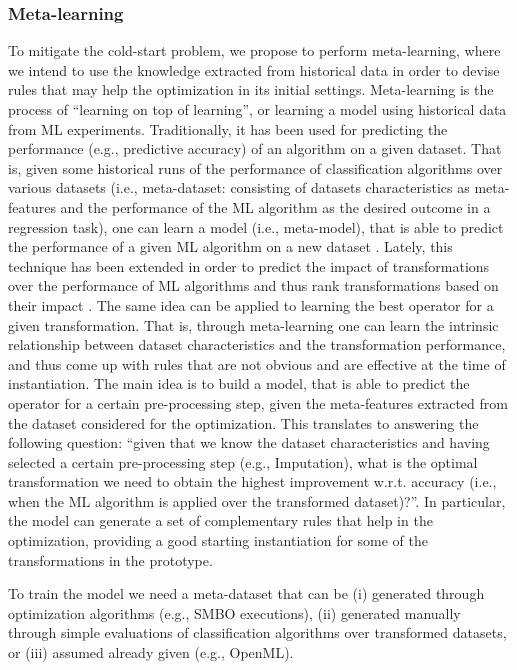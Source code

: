 \subsubsection{Meta-learning}
To mitigate the cold-start problem, we propose to perform meta-learning, where we intend to use the knowledge extracted from historical data in order to devise rules that may help the optimization in its initial settings.
Meta-learning is the process of ``learning on top of learning'', or learning a model using historical data from ML experiments.
Traditionally, it has been used for predicting the performance (e.g., predictive accuracy) of an algorithm on a given dataset.
That is, given some historical runs of the performance of classification algorithms over various datasets (i.e., meta-dataset: consisting of datasets characteristics as meta-features and the performance of the ML algorithm as the desired outcome in a regression task), one can learn a model (i.e., meta-model), that is able to predict the performance of a given ML algorithm on a new dataset \cite{Brazdil04Book}.
Lately, this technique has been extended in order to predict the impact of transformations over the performance of ML algorithms and thus rank transformations based on their impact \cite{Bilalli17AMCS, presistant18CSI, presistant19DKE}.
The same idea can be applied to learning the best operator for a given transformation.
That is, through meta-learning one can learn the intrinsic relationship between dataset characteristics and the transformation performance, and thus come up with rules that are not obvious and are effective at the time of instantiation.
The main idea is to build a model, that is able to predict the operator for a certain pre-processing step, given the meta-features extracted from the dataset considered for the optimization.
This translates to answering the following question: ``given that we know the dataset characteristics and having selected a certain pre-processing step (e.g., Imputation), what is the optimal transformation we need to obtain the highest improvement w.r.t. accuracy (i.e., when the ML algorithm is applied over the transformed dataset)?''.
In particular, the model can generate a set of complementary rules that help in the optimization, providing a good starting instantiation for some of the transformations in the prototype.

To train the model we need a meta-dataset that can be  (i) generated through optimization algorithms (e.g., SMBO executions), (ii) generated manually through simple evaluations of classification algorithms over transformed datasets, or (iii) assumed already given (e.g., OpenML).

